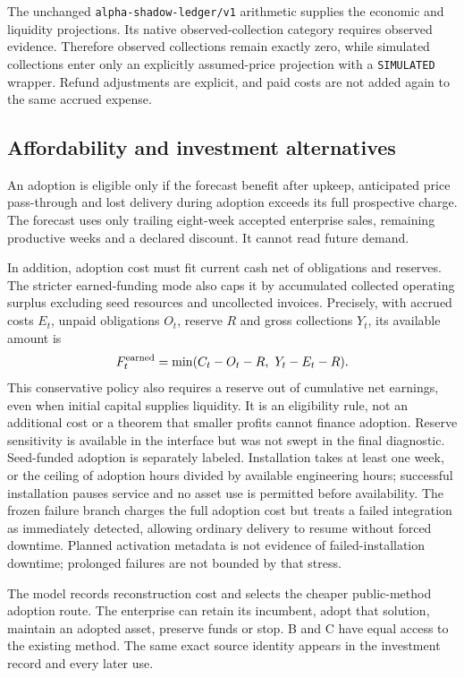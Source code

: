 \documentclass[11pt,a4paper]{article}
\begin{document}
The unchanged \texttt{alpha-shadow-ledger/v1} arithmetic supplies the economic and liquidity
projections. Its native observed-collection category requires observed evidence. Therefore
observed collections remain exactly zero, while simulated collections enter only an explicitly
assumed-price projection with a \texttt{SIMULATED} wrapper. Refund adjustments are explicit,
and paid costs are not added again to the same accrued expense.

\subsection{Affordability and investment alternatives}
An adoption is eligible only if the forecast benefit after upkeep, anticipated price pass-through
and lost delivery during adoption exceeds its full prospective charge. The forecast uses only
trailing eight-week accepted enterprise sales, remaining productive weeks and a declared
discount. It cannot read future demand.

In addition, adoption cost must fit current cash net of obligations and reserves. The stricter
earned-funding mode also caps it by accumulated collected operating surplus excluding seed
resources and uncollected invoices. Precisely, with accrued costs \(E_t\), unpaid obligations \(O_t\),
reserve \(R\) and gross collections \(Y_t\), its available amount is
\[
F_t^{\rm earned}=\min(C_t-O_t-R,\ Y_t-E_t-R).
\]
This conservative policy also requires a reserve out of cumulative net earnings, even when initial
capital supplies liquidity. It is an eligibility rule, not an additional cost or a theorem that
smaller profits cannot finance adoption. Reserve sensitivity is available in the interface but
was not swept in the final diagnostic. Seed-funded adoption is separately labeled. Installation
takes at least one week, or the ceiling of adoption hours divided by available engineering
hours; successful installation pauses service and no asset use is permitted before availability.
The frozen failure branch charges the full adoption cost but treats a failed integration as
immediately detected, allowing ordinary delivery to resume without forced downtime. Planned
activation metadata is not evidence of failed-installation downtime; prolonged failures are not bounded by that stress.

The model records reconstruction cost and selects the cheaper public-method adoption route.
The enterprise can retain its incumbent, adopt that solution, maintain an adopted asset,
preserve funds or stop. B and C have equal access to the existing method. The same exact source identity appears in the investment record
and every later use.
\end{document}
